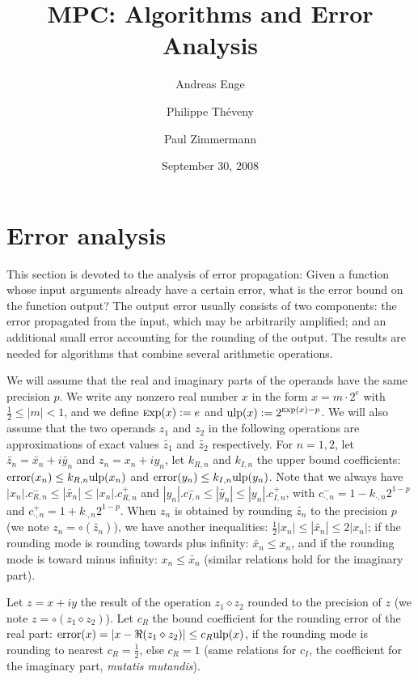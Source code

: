 \documentclass {article}
\title {MPC: Algorithms and Error Analysis}
\author {Andreas Enge \and Philippe Th\'eveny \and Paul Zimmermann}
\date {September 30, 2008}
\newcommand {\Ulp}{{\rm ulp}}
\DeclareMathOperator{\error}{error}
\DeclareMathOperator{\Exp}{{\rm \textsc exp}}
\begin{document}
\maketitle
\tableofcontents


\section {Error analysis}

This section is devoted to the analysis of error propagation: Given a function
whose input arguments already have a certain error, what is the error bound on
the function output? The output error usually consists of two components: the
error propagated from the input, which may be arbitrarily amplified; and an
additional small error accounting for the rounding of the output. The results
are needed for algorithms that combine several arithmetic operations.

We will assume that the real and imaginary parts of the operands have the same
precision $p$. We write any nonzero real number $x$ in the form $x = m \cdot
2^e$ with $\frac{1}{2} \le |m| < 1$, and we define $\Exp(x) := e$ and $\Ulp(x)
:= 2^{\Exp(x) - p}$.  We will also assume that the two operands $z_1$ and
$z_2$ in the following operations are approximations of exact values
$\widetilde{z_1}$ and $\widetilde{z_2}$ respectively. For $n=1, 2$, let
$\widetilde{z_n} = \widetilde{x_n} + i \widetilde{y_n}$ and $z_n = x_n + i
y_n$, let $k_{R,n}$ and $k_{I,n}$ the upper bound coefficients: $\error(x_n)
\leq k_{R,n} \Ulp(x_n)$ and $\error(y_n) \leq k_{I,n} \Ulp(y_n)$.  Note that
we always have $|x_n|.c_{R,n}^- \leq |\widetilde{x_n}| \leq |x_n|.c_{R,n}^+$
and $|y_n|.c_{I,n}^- \leq |\widetilde{y_n}| \leq |y_n|.c_{I,n}^+$, with
$c_{\cdot,n}^- = 1-k_{\cdot,n}2^{1-p}$ and $c_{\cdot,n}^+ =
1+k_{\cdot,n}2^{1-p}$. When $z_n$ is obtained by rounding $\widetilde{z_n}$ to
the precision $p$ (we note $z_n=\circ(\widetilde{z_n})$), we have another
inequalities: $\frac{1}{2}|x_n| \leq |\widetilde{x_n}| \leq 2|x_n|$; if the
rounding mode is rounding towards plus infinity: $\widetilde{x_n} \leq x_n$,
and if the rounding mode is toward minus infinity: $x_n \leq \widetilde{x_n}$
(similar relations hold for the imaginary part).

Let $z=x+iy$ the result of the operation $z_1\diamond z_2$ rounded to the
precision of $z$ (we note $z=\circ(z_1 \diamond z_2)$). Let $c_R$ the bound
coefficient for the rounding error of the real part: $\error(x) = |x-\Re(z_1
\diamond z_2)| \leq c_R \Ulp(x)$, if the rounding mode is rounding to nearest
$c_R=\frac{1}{2}$, else $c_R=1$ (same relations for $c_I$, the coefficient for
the imaginary part, \emph{mutatis mutandis}).
\end{document}
